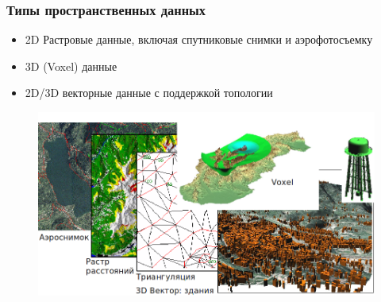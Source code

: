 \begin{frame}
\frametitle{Типы пространственных данных}
\begin{itemize}
\item 2D Растровые данные, включая спутниковые снимки и аэрофотосъемку
\item 3D (Voxel) данные
\item  2D/3D векторные данные с поддержкой топологии
\end{itemize}
\begin{figure}[!ht]
          \begin{center}
            \includegraphics[width=0.8\columnwidth]{./grass/img/datatypes.png}
        \end{center}
\end{figure}
\end{frame}

